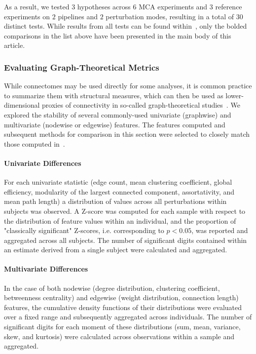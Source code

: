 \documentclass[fleqn,10pt]{SelfArx} %
\newcommand{\new}[1]{{\color{blue} #1}}
\begin{document}
As a result, we tested $3$ hypotheses across $6$ MCA experiments and $3$ reference experiments on $2$ pipelines and $2$
perturbation modes, resulting in a total of $30$ distinct tests. \new{While results from all tests can be found
within~\sref{supsec:discrimfull}, only the bolded comparisons in the list above have been presented in the main body of
this article.}

\subsubsection*{Evaluating Graph-Theoretical Metrics}
While connectomes may be used directly for some analyses, it is common practice to summarize them with structural
measures, which can then be used as lower-dimensional proxies of connectivity in so-called graph-theoretical
studies~\cite{Rubinov2010-fh}. We explored the stability of several commonly-used univariate (graphwise) and
multivariate (nodewise or edgewise) features. The features computed and subsequent methods for comparison in this
section were selected to closely match those computed in~\cite{Betzel2018-eo}.

\paragraph{Univariate Differences} For each univariate statistic (edge count, mean clustering coefficient, global
efficiency, modularity of the largest connected component, assortativity, and mean path length) a distribution of
values across all perturbations within subjects was observed. A Z-score was computed for each sample with respect to
the distribution of feature values within an individual, and the proportion of "classically significant" Z-scores, i.e.
corresponding to $p < 0.05$, was reported and aggregated across all subjects. The number of significant digits
contained within an estimate derived from a single subject were calculated and aggregated.

\paragraph{Multivariate Differences} In the case of both nodewise (degree distribution, clustering coefficient,
betweenness centrality) and edgewise (weight distribution, connection length) features, the cumulative density
functions of their distributions were evaluated over a fixed range and subsequently aggregated across individuals. The
number of significant digits for each moment of these distributions (sum, mean, variance, skew, and kurtosis) were
calculated across observations within a sample and aggregated.
\end{document}
